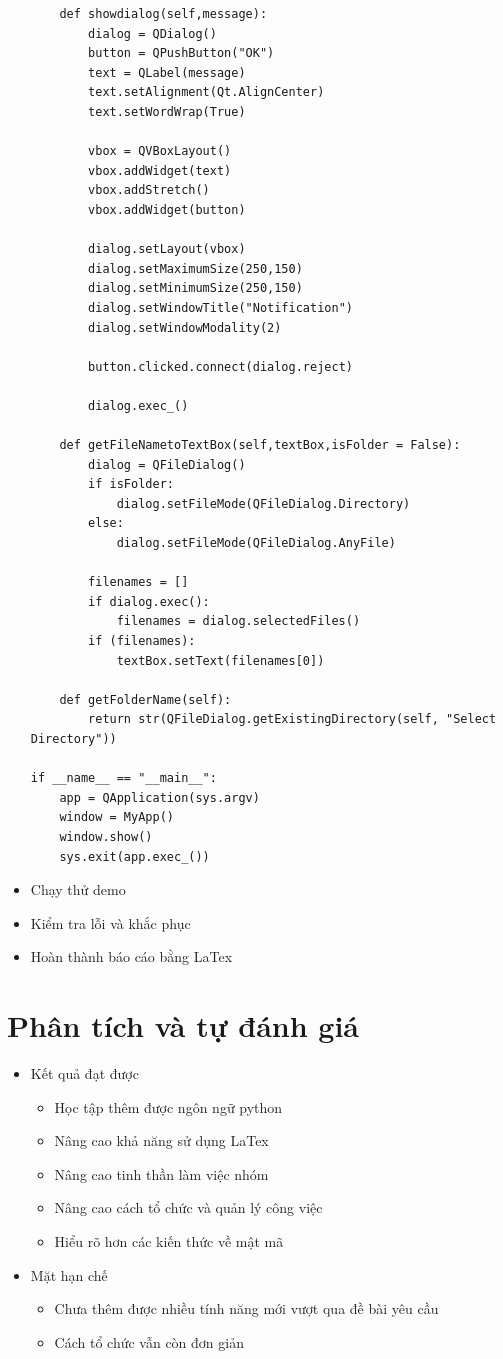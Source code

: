 \documentclass[a4paper]{article}
\begin{document}
\begin{itemize}
\begin{lstlisting}
    def showdialog(self,message):
        dialog = QDialog()
        button = QPushButton("OK")
        text = QLabel(message)
        text.setAlignment(Qt.AlignCenter)
        text.setWordWrap(True)

        vbox = QVBoxLayout()
        vbox.addWidget(text)
        vbox.addStretch()
        vbox.addWidget(button)

        dialog.setLayout(vbox)
        dialog.setMaximumSize(250,150)
        dialog.setMinimumSize(250,150)
        dialog.setWindowTitle("Notification")
        dialog.setWindowModality(2)

        button.clicked.connect(dialog.reject)

        dialog.exec_()

    def getFileNametoTextBox(self,textBox,isFolder = False):
        dialog = QFileDialog()
        if isFolder:
            dialog.setFileMode(QFileDialog.Directory)
        else:
            dialog.setFileMode(QFileDialog.AnyFile)
        
        filenames = []
        if dialog.exec():
            filenames = dialog.selectedFiles()
        if (filenames):
            textBox.setText(filenames[0])
   
    def getFolderName(self):
        return str(QFileDialog.getExistingDirectory(self, "Select Directory"))

if __name__ == "__main__":
    app = QApplication(sys.argv)
    window = MyApp()
    window.show()
    sys.exit(app.exec_())
		\end{lstlisting}
	\item
	Chạy thử demo
	\item
	Kiểm tra lỗi và khắc phục
	\item
	Hoàn thành báo cáo bằng LaTex
\end{itemize}
\section{Phân tích và tự đánh giá}
	
	\begin{itemize}
		\item
		Kết quả đạt được
		\begin{itemize}
			\item
			Học tập thêm được ngôn ngữ python
			\item
			Nâng cao khả năng sử dụng LaTex
			\item
			Nâng cao tinh thần làm việc nhóm
			\item
			Nâng cao cách tổ chức và quản lý công việc
			\item
			Hiểu rõ hơn các kiến thức về mật mã
		\end{itemize}
		\item
		Mặt hạn chế
			\begin{itemize}
				\item
				Chưa thêm được nhiều tính năng mới vượt qua đề bài yêu cầu
				\item
				Cách tổ chức vẫn còn đơn giản
			\end{itemize}		
\end{itemize}
\end{document}
